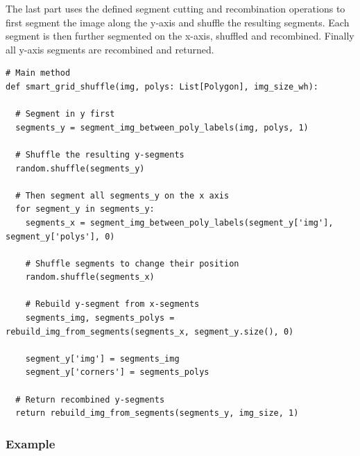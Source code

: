 \documentclass[10pt]{book}
\newenvironment{code}{\captionsetup{type=listing}}{}
\begin{document}
The last part uses the defined segment cutting and recombination operations to first segment the image along the y-axis and shuffle the resulting segments. Each segment is then further segmented on the x-axis, shuffled and recombined. Finally all y-axis segments are recombined and returned.

\begin{code}
\label{lst:sgs_main}
\begin{verbatim}
# Main method
def smart_grid_shuffle(img, polys: List[Polygon], img_size_wh):

  # Segment in y first
  segments_y = segment_img_between_poly_labels(img, polys, 1)

  # Shuffle the resulting y-segments
  random.shuffle(segments_y)

  # Then segment all segments_y on the x axis
  for segment_y in segments_y:
    segments_x = segment_img_between_poly_labels(segment_y['img'], segment_y['polys'], 0)

    # Shuffle segments to change their position
    random.shuffle(segments_x)
    
    # Rebuild y-segment from x-segments
    segments_img, segments_polys = rebuild_img_from_segments(segments_x, segment_y.size(), 0)
    
    segment_y['img'] = segments_img
    segment_y['corners'] = segments_polys

  # Return recombined y-segments
  return rebuild_img_from_segments(segments_y, img_size, 1)
\end{verbatim}
\end{code}

\subsubsection{Example}
\end{document}
